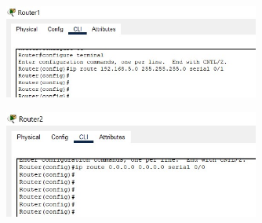 \documentclass{article}
\begin{document}
\section{}%
\begin{figure}[H]
    \centering
    \includegraphics[width=0.75\textwidth]{figures/20.jpg}
    \caption{}
    \label{fig:fig1}
\end{figure}
\begin{figure}[H]
    \centering
    \includegraphics[width=0.75\textwidth]{figures/21.jpg}
    \caption{}
    \label{fig:fig1}
\end{figure}
\end{document}
